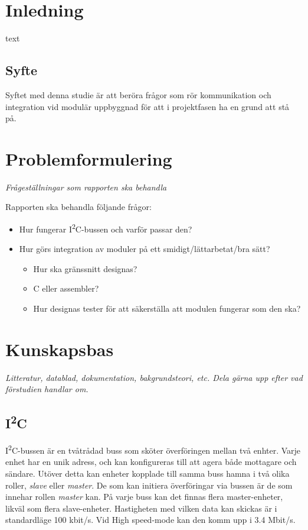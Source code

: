 \documentclass[11pt]{article}
\begin{document}
\begin{flushleft}

\section{Inledning}
text \cite{893287}

\subsection{Syfte}
Syftet med denna studie är att beröra frågor som rör kommunikation och integration vid modulär uppbyggnad för att i projektfasen ha en grund att stå på.

\pagebreak

\section{Problemformulering}
\textit{Frågeställningar som rapporten ska behandla}

Rapporten ska behandla följande frågor:

\begin{itemize}
	\item Hur fungerar I\textsuperscript{2}C-bussen och varför passar den?
	\item Hur görs integration av moduler på ett smidigt/lättarbetat/bra sätt?
	
		\begin{itemize}
			\item Hur ska gränssnitt designas?
			\item C eller assembler?
			\item Hur designas tester för att säkerställa att modulen fungerar som den ska?
		\end{itemize}

\end{itemize}

\pagebreak

\section{Kunskapsbas}
\textit{Litteratur, datablad, dokumentation, bakgrundsteori, etc. Dela gärna upp efter vad förstudien handlar om.}

\subsection{I\textsuperscript{2}C}
I\textsuperscript{2}C-bussen är en tvåtrådad buss som sköter överföringen mellan två enhter. Varje enhet har en unik adress, och kan konfigureras till att agera både mottagare och sändare. Utöver detta kan enheter kopplade till samma buss hamna i två olika roller, \textit{slave} eller \textit{master}. De som kan initiera överföringar via bussen är de som innehar rollen \textit{master} kan. På varje buss kan det finnas flera master-enheter, likväl som flera slave-enheter. Hastigheten med vilken data kan skickas är i standardläge 100 kbit/s. Vid High speed-mode kan den komm upp i 3.4 Mbit/s.


\end{flushleft}
\end{document}
